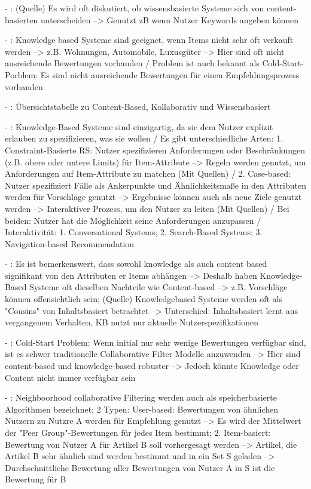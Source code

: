 - \cite[S. 15]{recommenderSystems:2016}: (Quelle) Es wird oft diskutiert, ob wissensbasierte Systeme sich von content-basierten unterscheiden --> Genutzt zB wenn Nutzer Keywords angeben können

- \cite[S. 15]{recommenderSystems:2016}: Knowledge based Systeme sind geeignet, wenn Items nicht sehr oft verkauft werden --> z.B. Wohnungen, Automobile, Luxusgüter --> Hier sind oft nicht ausreichende Bewertungen vorhanden / Problem ist auch bekannt als Cold-Start-Porblem: Es sind nicht ausreichende Bewertungen für einen Empfehlungsprozess vorhanden 

- \cite[S. 16]{recommenderSystems:2016}: Übersichtstabelle zu Content-Based, Kollaborativ und Wissensbasiert 

- \cite[S. 16f.]{recommenderSystems:2016}: Knowledge-Based Systeme sind einzigartig, da sie dem Nutzer explizit erlauben zu spezifizieren, was sie wollen / Es gibt unterschiedliche Arten: 1. Constraint-Basierte RS: Nutzer spezifizieren Anforderungen oder Beschränkungen (z.B. obere oder untere Limits) für Item-Attribute --> Regeln werden genutzt, um Anforderungen auf Item-Attribute zu matchen (Mit Quellen) / 2. Case-based: Nutzer spezifiziert Fälle als Ankerpunkte und Ähnlichkeitsmaße in den Attributen werden für Vorschläge genutzt --> Ergebnisse können auch als neue Ziele genutzt werden --> Interaktiver Prozess, um den Nutzer zu leiten (Mit Quellen) / Bei beiden: Nutzer hat die Möglichkeit seine Anforderungen anzupassen / Interaktivität: 1. Conversational Systems; 2. Search-Based Systems; 3. Navigation-based Recommendation

- \cite[S. 18]{recommenderSystems:2016}: Es ist bemerkenswert, dass sowohl knowledge als auch content based signifikant von den Attributen er Items abhängen --> Deshalb haben Knowledge-Based Systeme oft dieselben Nachteile wie Content-based --> z.B. Vorschläge können offensichtlich sein; (Quelle) Knowledgebased Systeme werden oft als "Cousins" von Inhaltsbasiert betrachtet --> Unterschied: Inhaltsbasiert lernt aus vergangenem Verhalten, KB nutzt nur aktuelle Nutzerspezifikationen 

- \cite[S. 24]{recommenderSystems:2016}: Cold-Start Problem: Wenn initial nur sehr wenige Bewertungen verfügbar sind, ist es schwer traditionelle Collaborative Filter Modelle anzuwenden --> Hier sind content-based und knowledge-based robuster --> Jedoch könnte Knowledge oder Content nicht immer verfügbar sein

- \cite[S. 29]{recommenderSystems:2016}: Neighboorhood collaborative Filtering werden auch als speicherbasierte Algorithmen bezeichnet; 2 Typen: User-based: Bewertungen von ähnlichen Nutzern zu Nutzre A werden für Empfehlung genutzt --> Es wird der Mittelwert der "Peer Group"-Bewertungen für jedes Item bestimmt; 2. Item-basiert: Bewertung von Nutzer A für Artikel B soll vorhergesagt werden --> Artikel, die Artikel B sehr ähnlich sind werden bestimmt und in ein Set S geladen --> Durchschnittliche Bewertung aller Bewertungen von Nutzer A in S ist die Bewertung für B

